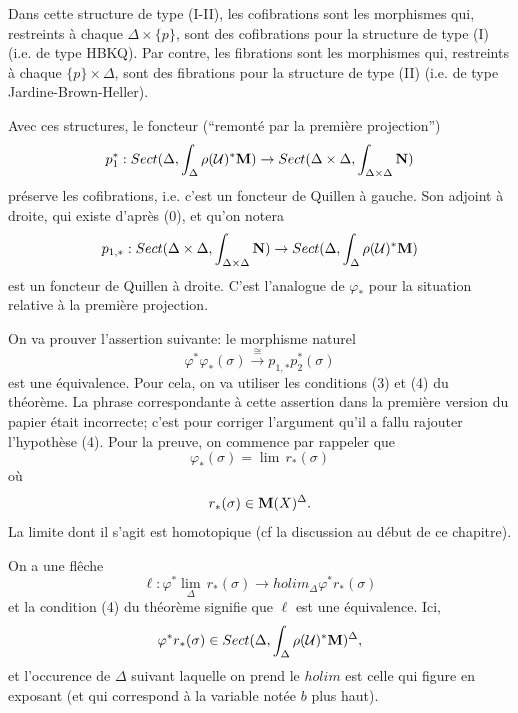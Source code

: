 \documentclass[12pt]{article}
\newcommand{\mm}{{\bf M}}
\newcommand{\nn}{{\bf N}}
\newcommand{\Uu}{{\cal U}}
\begin{document}
Dans cette structure de type (I-II), les cofibrations sont les morphismes qui,
restreints \`a chaque $\Delta \times \{ p\}$, sont des cofibrations pour la
structure de type (I) (i.e. de type HBKQ). Par contre, les
fibrations sont les morphismes qui, restreints \`a chaque $\{ p\} \times
\Delta$, sont des fibrations pour la structure de type (II) (i.e. de type
Jardine-Brown-Heller).

Avec ces structures, le foncteur (``remont\'e par la premi\`ere projection'')
$$
p_1^{\ast} : Sect (\Delta , \int _{\Delta} \rho (\Uu )^{\ast} \mm )
\rightarrow
Sect (\Delta \times \Delta ,
\int _{\Delta \times \Delta}\nn )
$$
pr\'eserve les cofibrations, i.e. c'est un foncteur de Quillen \`a gauche.
Son adjoint \`a droite, qui existe d'apr\`es (0), et qu'on notera
$$
p _{1,\ast}: Sect (\Delta \times \Delta ,
\int _{\Delta \times \Delta}\nn )\rightarrow
Sect (\Delta , \int _{\Delta} \rho (\Uu )^{\ast} \mm )
$$
est un foncteur de Quillen \`a droite. C'est
l'analogue de $\varphi _{\ast}$ pour la situation relative \`a la
premi\`ere projection.


On va prouver l'assertion suivante: 
le morphisme
naturel
$$
\varphi ^{\ast} \varphi _{\ast} (\sigma )\stackrel{\cong}{\rightarrow}
p _{1,\ast}p_2^{\ast} (\sigma )
$$
est une \'equivalence. Pour cela, on va utiliser
 les conditions (3) et (4) du th\'eor\`eme.
La phrase correspondante \`a cette assertion dans la premi\`ere version
du papier \'etait incorrecte; c'est pour corriger l'argument qu'il 
a fallu rajouter
l'hypoth\`ese (4).  Pour la preuve, on commence par rappeler que 
$$
\varphi _{\ast} ( \sigma ) = \lim \, r_{\ast} (\sigma )
$$
o\`u 
$$
r_{\ast} (\sigma ) \in \mm (X) ^{\Delta} .
$$
La limite dont il s'agit est homotopique (cf la discussion au d\'ebut de ce 
chapitre).


On a une fl\^eche 
$$
\ell : \varphi ^{\ast} \lim _{\Delta}\, r_{\ast} (\sigma ) \rightarrow 
holim _{\Delta} \varphi ^{\ast} r_{\ast} (\sigma )
$$ 
et la condition (4) du th\'eor\`eme signifie que $\ell $ 
est  une \'equivalence. Ici, 
$$ 
\varphi ^{\ast}r_{\ast} (\sigma ) \in 
Sect (\Delta , \int _{\Delta}\rho (\Uu )^{\ast} \mm )^{\Delta},
$$
et l'occurence de $\Delta$ suivant laquelle on prend le $holim$ est celle qui
figure en exposant
(et qui correspond \`a la  variable not\'ee $b$ plus haut).
\end{document}
